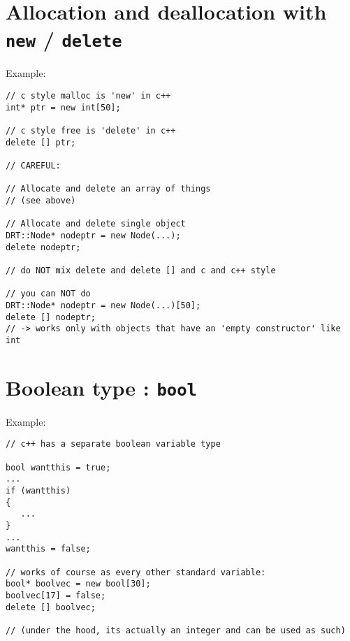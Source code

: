 \section{Allocation and deallocation with \texttt{new} / \texttt{delete}}
Example:\\
\begin{boxedminipage}{\linewidth}
\begin{verbatim}
// c style malloc is 'new' in c++
int* ptr = new int[50];

// c style free is 'delete' in c++
delete [] ptr;

// CAREFUL:

// Allocate and delete an array of things
// (see above)

// Allocate and delete single object
DRT::Node* nodeptr = new Node(...);
delete nodeptr;

// do NOT mix delete and delete [] and c and c++ style

// you can NOT do
DRT::Node* nodeptr = new Node(...)[50];
delete [] nodeptr;
// -> works only with objects that have an 'empty constructor' like int
\end{verbatim}
\end{boxedminipage}

\section{Boolean type : \texttt{bool}}
Example:\\
\begin{boxedminipage}{\linewidth}
\begin{verbatim}
// c++ has a separate boolean variable type

bool wantthis = true;
...
if (wantthis)
{
   ...
}
...
wantthis = false;

// works of course as every other standard variable:
bool* boolvec = new bool[30];
boolvec[17] = false;
delete [] boolvec;

// (under the hood, its actually an integer and can be used as such)
\end{verbatim}
\end{boxedminipage}

